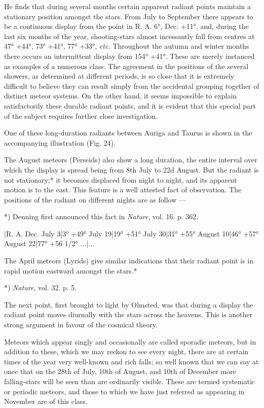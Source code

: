 \documentclass[a4paper, 12pt, oneside, polutonikogreek, english]{article}
\begin{document}
He finds that during several months certain apparent radiant points maintain a stationary position amongst the stars. From July to September there appears to be a continuous display from the point in R. A. 6°, Dec. +11°, and, during the last six months of the year, shooting-stars almost incessantly fall from centres at 47° +44°, 73° +41°, 77° +33°, \emph{etc.} Throughout the autumn and winter months there occurs an intermittent display from 154° +41°. These are merely instanced as examples of a numerous class. The agreement in the positions of the several showers, as determined at different periods, is so close that it is extremely difficult to believe they can result simply from the accidental grouping together of distinct meteor systems. On the other hand, it seems impossible to explain satisfactorily these durable radiant points, and it is evident that this special part of the subject requires further close investigation.

One of these long-duration radiants between Auriga and Taurus is shown in the accompanying illustration (Fig. 24).

The August meteors (Perseids) also show a long duration, the entire interval over which the display is spread being from 8th July to 22d August. But the radiant is not stationary;* it becomes displaced from night to night, and its apparent motion is to the east. This feature is a well attested fact of observation. The positions of the radiant on different nights are as follow ---

*) Denning first announced this fact in \emph{Nature}, vol. 16. p. 362.

|R. A. Dec. 
July 3|3° +49° 
July 19|19° +51° 
July 30|31° +55° 
August 10|46° +57° 
August 22|77° +56 1/2° 
...|...

The April meteors (Lyrids) give similar indications that their radiant point is in rapid motion eastward amongst the stars.*

*) \emph{Nature}, vol. 32. p. 5.

The next point, first brought to light by Olmsted, was that during a display the radiant point moves diurnally with the stars across the heavens. This is another strong argument in favour of the cosmical theory.

Meteors which appear singly and occasionally are called sporadic meteors, but in addition to these, which we may reckon to see every night, there are at certain times of the year very well-known and rich falls; so well known that we can say at once that on the 28th of July, 10th of August, and 10th of December more falling-stars will be seen than are ordinarily visible. These are termed systematic or periodic meteors, and those to which we have just referred as appearing in November are of this class.
\end{document}
